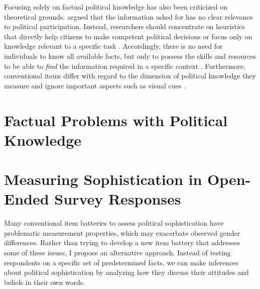 \documentclass[12pt]{article}
\begin{document}
Focusing solely on factual political knowledge has also been criticized on theoretical grounds. \citet{lupia2006elitism} argued that the information asked for has no clear relevance to political participation. Instead, researchers should concentrate on heuristics that directly help citizens to make competent political decisions or focus only on knowledge relevant to a specific task \citep[see also][]{lupia1994shortcuts}. Accordingly, there is no need for individuals to know all available facts, but only to possess the skills and resources to be able to \textit{find} the information required in a specific context \citep{prior2008money}. Furthermore, conventional items differ with regard to the dimension of political knowledge they measure \citep{barabas2014question} and ignore important aspects such as visual cues \citep{prior2014visual}.


\section*{Factual Problems with Political Knowledge}


\section*{Measuring Sophistication in Open-Ended Survey Responses}


Many conventional item batteries to assess political sophistication have problematic measurement properties, which may exacerbate observed gender differences. Rather than trying to develop a new item battery that addresses some of these issues, I propose an alternative approach. Instead of testing respondents on a specific set of predetermined facts, we can make inferences about political sophistication by analyzing how they discuss their attitudes and beliefs in their own words.
\end{document}

